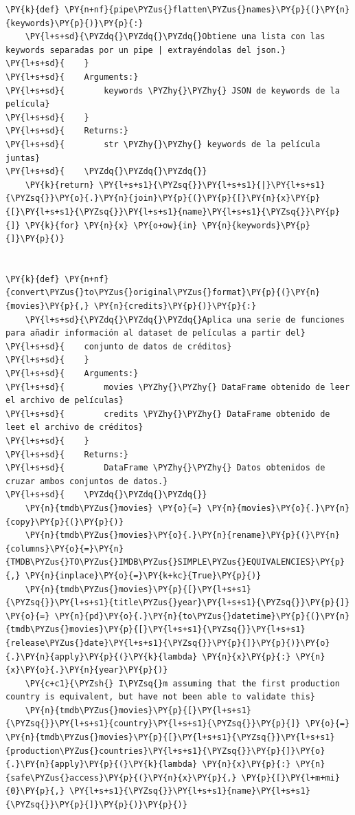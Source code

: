 \begin{tcolorbox}[breakable, size=fbox, boxrule=1pt, pad at break*=1mm,colback=cellbackground, colframe=cellborder]
\begin{Verbatim}[commandchars=\\\{\}]
\PY{k}{def} \PY{n+nf}{pipe\PYZus{}flatten\PYZus{}names}\PY{p}{(}\PY{n}{keywords}\PY{p}{)}\PY{p}{:}
    \PY{l+s+sd}{\PYZdq{}\PYZdq{}\PYZdq{}Obtiene una lista con las keywords separadas por un pipe | extrayéndolas del json.}
\PY{l+s+sd}{    }
\PY{l+s+sd}{    Arguments:}
\PY{l+s+sd}{        keywords \PYZhy{}\PYZhy{} JSON de keywords de la película}
\PY{l+s+sd}{    }
\PY{l+s+sd}{    Returns:}
\PY{l+s+sd}{        str \PYZhy{}\PYZhy{} keywords de la película juntas}
\PY{l+s+sd}{    \PYZdq{}\PYZdq{}\PYZdq{}}
    \PY{k}{return} \PY{l+s+s1}{\PYZsq{}}\PY{l+s+s1}{|}\PY{l+s+s1}{\PYZsq{}}\PY{o}{.}\PY{n}{join}\PY{p}{(}\PY{p}{[}\PY{n}{x}\PY{p}{[}\PY{l+s+s1}{\PYZsq{}}\PY{l+s+s1}{name}\PY{l+s+s1}{\PYZsq{}}\PY{p}{]} \PY{k}{for} \PY{n}{x} \PY{o+ow}{in} \PY{n}{keywords}\PY{p}{]}\PY{p}{)}


\PY{k}{def} \PY{n+nf}{convert\PYZus{}to\PYZus{}original\PYZus{}format}\PY{p}{(}\PY{n}{movies}\PY{p}{,} \PY{n}{credits}\PY{p}{)}\PY{p}{:}
    \PY{l+s+sd}{\PYZdq{}\PYZdq{}\PYZdq{}Aplica una serie de funciones para añadir información al dataset de películas a partir del}
\PY{l+s+sd}{    conjunto de datos de créditos}
\PY{l+s+sd}{    }
\PY{l+s+sd}{    Arguments:}
\PY{l+s+sd}{        movies \PYZhy{}\PYZhy{} DataFrame obtenido de leer el archivo de películas}
\PY{l+s+sd}{        credits \PYZhy{}\PYZhy{} DataFrame obtenido de leet el archivo de créditos}
\PY{l+s+sd}{    }
\PY{l+s+sd}{    Returns:}
\PY{l+s+sd}{        DataFrame \PYZhy{}\PYZhy{} Datos obtenidos de cruzar ambos conjuntos de datos.}
\PY{l+s+sd}{    \PYZdq{}\PYZdq{}\PYZdq{}}
    \PY{n}{tmdb\PYZus{}movies} \PY{o}{=} \PY{n}{movies}\PY{o}{.}\PY{n}{copy}\PY{p}{(}\PY{p}{)}
    \PY{n}{tmdb\PYZus{}movies}\PY{o}{.}\PY{n}{rename}\PY{p}{(}\PY{n}{columns}\PY{o}{=}\PY{n}{TMDB\PYZus{}TO\PYZus{}IMDB\PYZus{}SIMPLE\PYZus{}EQUIVALENCIES}\PY{p}{,} \PY{n}{inplace}\PY{o}{=}\PY{k+kc}{True}\PY{p}{)}
    \PY{n}{tmdb\PYZus{}movies}\PY{p}{[}\PY{l+s+s1}{\PYZsq{}}\PY{l+s+s1}{title\PYZus{}year}\PY{l+s+s1}{\PYZsq{}}\PY{p}{]} \PY{o}{=} \PY{n}{pd}\PY{o}{.}\PY{n}{to\PYZus{}datetime}\PY{p}{(}\PY{n}{tmdb\PYZus{}movies}\PY{p}{[}\PY{l+s+s1}{\PYZsq{}}\PY{l+s+s1}{release\PYZus{}date}\PY{l+s+s1}{\PYZsq{}}\PY{p}{]}\PY{p}{)}\PY{o}{.}\PY{n}{apply}\PY{p}{(}\PY{k}{lambda} \PY{n}{x}\PY{p}{:} \PY{n}{x}\PY{o}{.}\PY{n}{year}\PY{p}{)}
    \PY{c+c1}{\PYZsh{} I\PYZsq{}m assuming that the first production country is equivalent, but have not been able to validate this}
    \PY{n}{tmdb\PYZus{}movies}\PY{p}{[}\PY{l+s+s1}{\PYZsq{}}\PY{l+s+s1}{country}\PY{l+s+s1}{\PYZsq{}}\PY{p}{]} \PY{o}{=} \PY{n}{tmdb\PYZus{}movies}\PY{p}{[}\PY{l+s+s1}{\PYZsq{}}\PY{l+s+s1}{production\PYZus{}countries}\PY{l+s+s1}{\PYZsq{}}\PY{p}{]}\PY{o}{.}\PY{n}{apply}\PY{p}{(}\PY{k}{lambda} \PY{n}{x}\PY{p}{:} \PY{n}{safe\PYZus{}access}\PY{p}{(}\PY{n}{x}\PY{p}{,} \PY{p}{[}\PY{l+m+mi}{0}\PY{p}{,} \PY{l+s+s1}{\PYZsq{}}\PY{l+s+s1}{name}\PY{l+s+s1}{\PYZsq{}}\PY{p}{]}\PY{p}{)}\PY{p}{)}

\end{Verbatim}
\end{tcolorbox}
